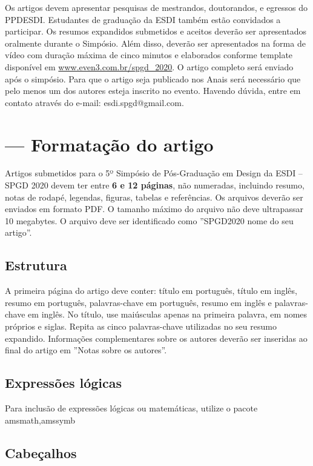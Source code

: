 \documentclass[a4paper,11pt,oneside,onecolumn,final]{article}
\begin{document}
Os artigos devem apresentar pesquisas de mestrandos, doutorandos, e egressos do PPDESDI. Estudantes de graduação da ESDI também estão convidados a participar. Os resumos expandidos submetidos e aceitos deverão ser apresentados oralmente durante o Simpósio. Além disso, deverão ser apresentados na forma de vídeo com duração máxima de cinco minutos e elaborados conforme template disponível em \url{www.even3.com.br/spgd_2020}. O artigo completo será enviado após o simpósio. Para que o artigo seja publicado nos Anais será necessário que pelo menos um dos autores esteja inscrito no evento. Havendo dúvida, entre em contato através do e-mail: esdi.spgd@gmail.com.

\section{— Formatação do artigo}

Artigos submetidos para o 5º Simpósio de Pós-Graduação em Design da ESDI – SPGD 2020 devem ter entre \textbf{6 e 12 páginas}, não numeradas, incluindo resumo, notas de rodapé, legendas, figuras, tabelas e referências. Os arquivos deverão ser enviados em formato PDF. O tamanho máximo do arquivo não deve ultrapassar 10 megabytes. O  arquivo deve ser identificado como ''SPGD2020 nome do seu artigo''. 

\subsection{Estrutura}

A primeira página do artigo deve conter: título em português, título em inglês, resumo em português, palavras-chave em português, resumo em inglês e palavras-chave em inglês. No título, use maiúsculas apenas na primeira palavra, em nomes próprios e siglas. Repita as cinco palavras-chave utilizadas no seu resumo expandido. Informações complementares sobre os autores deverão ser inseridas ao final do artigo em ''Notas sobre os autores''.

\subsection{Expressões lógicas}

Para inclusão de expressões lógicas ou matemáticas, utilize o pacote {amsmath,amssymb} 

\subsection{Cabeçalhos}
\end{document}
